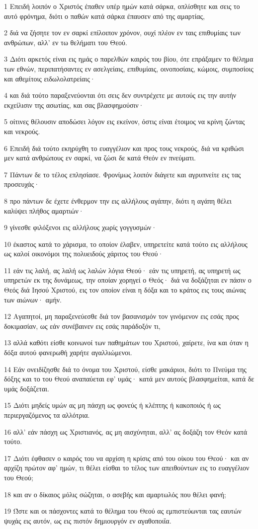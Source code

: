 \par 1 Επειδή λοιπόν ο Χριστός έπαθεν υπέρ ημών κατά σάρκα, οπλίσθητε και σεις το αυτό φρόνημα, διότι ο παθών κατά σάρκα έπαυσεν από της αμαρτίας,
\par 2 διά να ζήσητε τον εν σαρκί επίλοιπον χρόνον, ουχί πλέον εν ταις επιθυμίαις των ανθρώπων, αλλ' εν τω θελήματι του Θεού.
\par 3 Διότι αρκετός είναι εις ημάς ο παρελθών καιρός του βίου, ότε επράξαμεν το θέλημα των εθνών, περιπατήσαντες εν ασελγείαις, επιθυμίαις, οινοποσίαις, κώμοις, συμποσίοις και αθεμίτοις ειδωλολατρείαις·
\par 4 και διά τούτο παραξενεύονται ότι σεις δεν συντρέχετε με αυτούς εις την αυτήν εκχείλισιν της ασωτίας, και σας βλασφημούσιν·
\par 5 οίτινες θέλουσιν αποδώσει λόγον εις εκείνον, όστις είναι έτοιμος να κρίνη ζώντας και νεκρούς.
\par 6 Επειδή διά τούτο εκηρύχθη το ευαγγέλιον και προς τους νεκρούς, διά να κριθώσι μεν κατά ανθρώπους εν σαρκί, να ζώσι δε κατά Θεόν εν πνεύματι.
\par 7 Πάντων δε το τέλος επλησίασε. Φρονίμως λοιπόν διάγετε και αγρυπνείτε εις τας προσευχάς·
\par 8 προ πάντων δε έχετε ένθερμον την εις αλλήλους αγάπην, διότι η αγάπη θέλει καλύψει πλήθος αμαρτιών·
\par 9 γίνεσθε φιλόξενοι εις αλλήλους χωρίς γογγυσμών·
\par 10 έκαστος κατά το χάρισμα, το οποίον έλαβεν, υπηρετείτε κατά τούτο εις αλλήλους ως καλοί οικονόμοι της πολυειδούς χάριτος του Θεού·
\par 11 εάν τις λαλή, ας λαλή ως λαλών λόγια Θεού· εάν τις υπηρετή, ας υπηρετή ως υπηρετών εκ της δυνάμεως, την οποίαν χορηγεί ο Θεός· διά να δοξάζηται εν πάσιν ο Θεός διά Ιησού Χριστού, εις τον οποίον είναι η δόξα και το κράτος εις τους αιώνας των αιώνων· αμήν.
\par 12 Αγαπητοί, μη παραξενεύεσθε διά τον βασανισμόν τον γινόμενον εις εσάς προς δοκιμασίαν, ως εάν συνέβαινεν εις εσάς παράδοξόν τι,
\par 13 αλλά καθότι είσθε κοινωνοί των παθημάτων του Χριστού, χαίρετε, ίνα και όταν η δόξα αυτού φανερωθή χαρήτε αγαλλιώμενοι.
\par 14 Εάν ονειδίζησθε διά το όνομα του Χριστού, είσθε μακάριοι, διότι το Πνεύμα της δόξης και το του Θεού αναπαύεται εφ' υμάς· κατά μεν αυτούς βλασφημείται, κατά δε υμάς δοξάζεται.
\par 15 Διότι μηδείς υμών ας μη πάσχη ως φονεύς ή κλέπτης ή κακοποιός ή ως περιεργαζόμενος τα αλλότρια.
\par 16 αλλ' εάν πάσχη ως Χριστιανός, ας μη αισχύνηται, αλλ' ας δοξάζη τον Θεόν κατά τούτο.
\par 17 Διότι έφθασεν ο καιρός του να αρχίση η κρίσις από του οίκου του Θεού· και αν αρχίζη πρώτον αφ' ημών, τι θέλει είσθαι το τέλος των απειθούντων εις το ευαγγέλιον του Θεού;
\par 18 και αν ο δίκαιος μόλις σώζηται, ο ασεβής και αμαρτωλός που θέλει φανή;
\par 19 Ώστε και οι πάσχοντες κατά το θέλημα του Θεού ας εμπιστεύωνται τας εαυτών ψυχάς εις αυτόν, ως εις πιστόν δημιουργόν εν αγαθοποιΐα.

